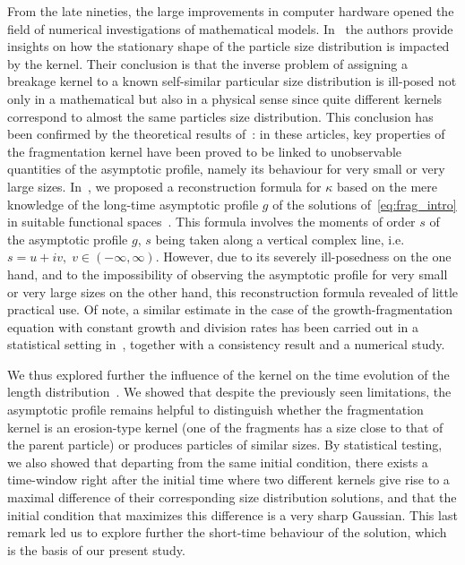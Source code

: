 \documentclass[AHL,Unicode,longabstracts,published]{cedram}
\begin{document}
From the late nineties, the large improvements in computer hardware opened the field of numerical investigations of mathematical models. In~\cite{KK05} the authors provide insights on how the stationary shape of the particle size distribution is impacted by the kernel. Their conclusion is that the inverse problem of assigning a breakage kernel to a known self-similar particular size distribution is ill-posed not only in a mathematical but also in a physical sense since quite different kernels correspond to almost the same particles size distribution. This conclusion has been confirmed by the theoretical results of~\cite{BCG13,DET18}: in these articles, key properties of the fragmentation kernel have been proved to be linked to unobservable quantities of the asymptotic profile, namely its behaviour for very small or very large sizes. In~\cite{DET18}, we proposed a reconstruction formula for $\kappa$ based on the mere knowledge of the long-time asymptotic profile $g$ of the solutions of~\eqref{eq:frag_intro} in suitable functional spaces~\cite{DET18}. This formula involves the moments of order $s$ of the asymptotic profile $g$, $s$ being taken along a vertical complex line, i.e. $s= u+i v, \; v\in (-\infty,\infty)$. However, due to its severely ill-posedness on the one hand, and to the impossibility of observing the asymptotic profile for very small or very large sizes on the other hand, this reconstruction formula revealed of little practical use. Of note, a similar estimate in the case of the growth-fragmentation equation with constant growth and division rates has been carried out in a statistical setting in~\cite{HNRT19}, together with a consistency result and a numerical study.

We thus explored further the influence of the kernel on the time evolution of the length distribution~\cite{DETX20}. We showed that despite the previously seen limitations, the asymptotic profile remains helpful to distinguish whether the fragmentation kernel is an erosion-type kernel (one of the fragments has a size close to that of the parent particle) or produces particles of similar sizes. By statistical testing, we also showed that departing from the same initial condition, there exists a time-window right after the initial time where two different kernels give rise to a maximal difference of their corresponding size distribution solutions, and that the initial condition that maximizes this difference is a very sharp Gaussian. This last remark led us to explore further the short-time behaviour of the solution, which is the basis of our present study.
\end{document}

